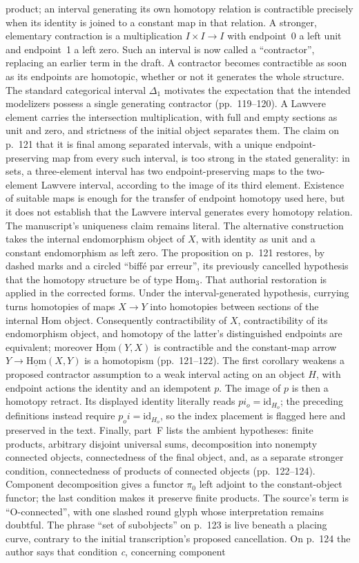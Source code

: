product; an interval generating its own homotopy relation is contractible precisely when its identity is joined to a constant map in that relation. A stronger, elementary contraction is a multiplication $I\times I\to I$ with endpoint~0 a left unit and endpoint~1 a left zero. Such an interval is now called a ``contractor'', replacing an earlier term in the draft. A contractor becomes contractible as soon as its endpoints are homotopic, whether or not it generates the whole structure. The standard categorical interval $\Delta_1$ motivates the expectation that the intended modelizers possess a single generating contractor (pp.~119--120). A Lawvere element carries the intersection multiplication, with full and empty sections as unit and zero, and strictness of the initial object separates them. The claim on p.~121 that it is final among separated intervals, with a unique endpoint-preserving map from every such interval, is too strong in the stated generality: in sets, a three-element interval has two endpoint-preserving maps to the two-element Lawvere interval, according to the image of its third element. Existence of suitable maps is enough for the transfer of endpoint homotopy used here, but it does not establish that the Lawvere interval generates every homotopy relation. The manuscript's uniqueness claim remains literal. The alternative construction takes the internal endomorphism object of $X$, with identity as unit and a constant endomorphism as left zero. The proposition on p.~121 restores, by dashed marks and a circled ``biffé par erreur'', its previously cancelled hypothesis that the homotopy structure be of type $\mathrm{Hom}_3$. That authorial restoration is applied in the corrected forms. Under the interval-generated hypothesis, currying turns homotopies of maps $X\to Y$ into homotopies between sections of the internal Hom object. Consequently contractibility of $X$, contractibility of its endomorphism object, and homotopy of the latter's distinguished endpoints are equivalent; moreover $\underline{\mathrm{Hom}}(Y,X)$ is contractible and the constant-map arrow $Y\to\underline{\mathrm{Hom}}(X,Y)$ is a homotopism (pp.~121--122). The first corollary weakens a proposed contractor assumption to a weak interval acting on an object $H$, with endpoint actions the identity and an idempotent $p$. The image of $p$ is then a homotopy retract. Its displayed identity literally reads $pi_o=\mathrm{id}_{H_o}$; the preceding definitions instead require $p_oi=\mathrm{id}_{H_o}$, so the index placement is flagged here and preserved in the text. Finally, part~F lists the ambient hypotheses: finite products, arbitrary disjoint universal sums, decomposition into nonempty connected objects, connectedness of the final object, and, as a separate stronger condition, connectedness of products of connected objects (pp.~122--124). Component decomposition gives a functor $\pi_0$ left adjoint to the constant-object functor; the last condition makes it preserve finite products. The source's term is ``O-connected'', with one slashed round glyph whose interpretation remains doubtful. The phrase ``set of subobjects'' on p.~123 is live beneath a placing curve, contrary to the initial transcription's proposed cancellation. On p.~124 the author says that condition \emph{c}, concerning component 